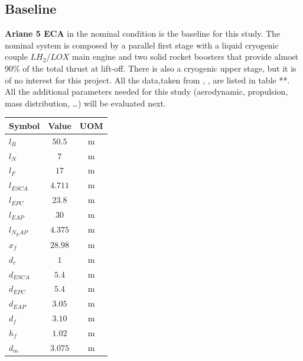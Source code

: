 \documentclass[12pt,fleqn,openany]{book} %
\begin{document}
\subsection{Baseline}
\textbf{Ariane 5 ECA} in the nominal condition is the baseline for this study. The nominal system is composed by a parallel first stage with a liquid cryogenic couple $LH_2/LOX$ main engine and two solid rocket boosters that provide almost 90\% of the total thrust at lift-off. There is also a cryogenic upper stage, but it is of no interest for this project. All the data,taken from \cite{bib:4}, \cite{bib:5}, \cite{bib:6} are listed in table **. All the additional parameters needed for this study (aerodynamic, propulsion, mass distribution, …) will be evaluated next.
\begin{table}[h]
	\centering
	\begin{tabular}{ l c c}
		\toprule
		Symbol									&Value 				&UOM	\\
		\midrule                                                                                                             
		$l_B  		$							&$50.5  $          &\si{\meter}        \\  
		$l_N  		$							&$7     $          &\si{\meter}        \\  
		$l_F  		$							&$17    $          &\si{\meter}        \\  
		$l_{ESCA}  	$							&$4.711 $          &\si{\meter}        \\
		$l_{EPC}  	$								&$23.8  $      &\si{\meter}        \\    
		$l_{EAP}  	$								&$30    $      &\si{\meter}        \\    
		$l_{N_EAP}  	$							&$4.375 $      &\si{\meter}        \\  
		$x_f  		$							&$28.98 $          &\si{\meter}        \\  
		$d_c  		$							&$1     $          &\si{\meter}        \\  
		$d_{ESCA}  	$							&$5.4   $          &\si{\meter}        \\
		$d_{EPC } 	$								&$5.4	$      &\si{\meter}        \\    
		$d_{EAP } 	$								&$3.05  $      &\si{\meter}        \\    
		$d_f  		$							&$3.10  $          &\si{\meter}        \\  
		$h_f  		$							&$1.02  $          &\si{\meter}        \\  
		$d_m  		$							&$3.075 $          &\si{\meter}        \\

\end{tabular}
\end{table}
\end{document}
